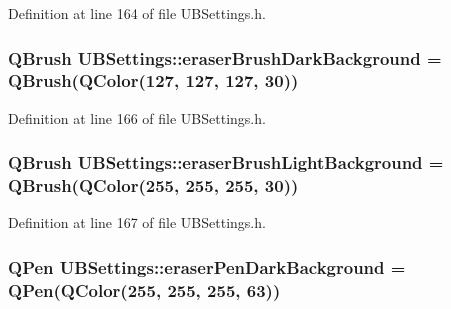 Definition at line 164 of file U\-B\-Settings.\-h.

\hypertarget{class_u_b_settings_ad409d408cad2bec308e795d578ae4e11}{
\subsubsection[{eraser\-Brush\-Dark\-Background}]{\setlength{\rightskip}{0pt plus 5cm}Q\-Brush U\-B\-Settings\-::eraser\-Brush\-Dark\-Background = Q\-Brush(Q\-Color(127, 127, 127, 30))\hspace{0.3cm}{\ttfamily [static]}}}\label{db/d66/class_u_b_settings_ad409d408cad2bec308e795d578ae4e11}


Definition at line 166 of file U\-B\-Settings.\-h.

\hypertarget{class_u_b_settings_a0b82313ebbe4d2fee587f4a59f2a50f6}{
\subsubsection[{eraser\-Brush\-Light\-Background}]{\setlength{\rightskip}{0pt plus 5cm}Q\-Brush U\-B\-Settings\-::eraser\-Brush\-Light\-Background = Q\-Brush(Q\-Color(255, 255, 255, 30))\hspace{0.3cm}{\ttfamily [static]}}}\label{db/d66/class_u_b_settings_a0b82313ebbe4d2fee587f4a59f2a50f6}


Definition at line 167 of file U\-B\-Settings.\-h.

\hypertarget{class_u_b_settings_a3bdae429668ae6e3d609a059c8ba5eae}{
\subsubsection[{eraser\-Pen\-Dark\-Background}]{\setlength{\rightskip}{0pt plus 5cm}Q\-Pen U\-B\-Settings\-::eraser\-Pen\-Dark\-Background = Q\-Pen(Q\-Color(255, 255, 255, 63))\hspace{0.3cm}{\ttfamily [static]}}}\label{db/d66/class_u_b_settings_a3bdae429668ae6e3d609a059c8ba5eae}


